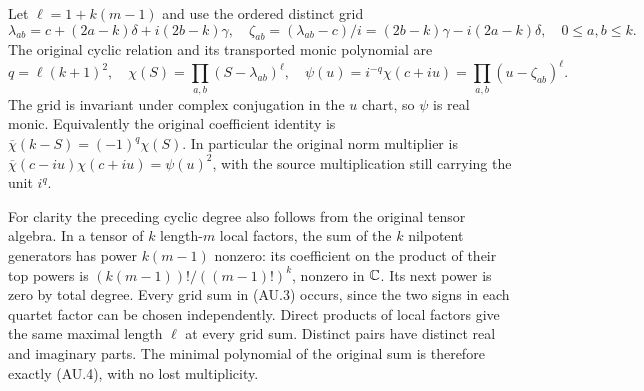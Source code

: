 Let $\ell=1+k(m-1)$ and use the ordered distinct grid
\[
 \lambda_{ab}=c+(2a-k)\delta+i(2b-k)\gamma,
 \quad \zeta_{ab}=(\lambda_{ab}-c)/i
     =(2b-k)\gamma-i(2a-k)\delta,
 \quad 0\le a,b\le k.                                      \tag{AU.3}
\]
The original cyclic relation and its transported monic polynomial are
\[
 q=\ell(k+1)^2,\quad
 \chi(S)=\prod_{a,b}(S-\lambda_{ab})^\ell,\quad
 \psi(u)=i^{-q}\chi(c+iu)=\prod_{a,b}(u-\zeta_{ab})^\ell.
 \tag{AU.4}
\]
The grid is invariant under complex conjugation in the $u$ chart, so
$\psi$ is real monic. Equivalently the original coefficient identity is
$\overline\chi(k-S)=(-1)^q\chi(S)$. In particular the original norm
multiplier is $\overline\chi(c-iu)\chi(c+iu)=\psi(u)^2$, with the
source multiplication still carrying the unit $i^q$.

For clarity the preceding cyclic degree also follows from the original
tensor algebra. In a tensor of $k$ length-$m$ local factors, the sum of
the $k$ nilpotent generators has power $k(m-1)$ nonzero: its coefficient
on the product of their top powers is $(k(m-1))!/((m-1)!)^k$, nonzero
in $\mathbb C$. Its next power is zero by total degree. Every grid sum in
(AU.3) occurs, since the two signs in each quartet factor can be chosen
independently. Direct products of local factors give the same maximal
length $\ell$ at every grid sum. Distinct pairs have distinct real and
imaginary parts. The minimal polynomial of the original sum is
therefore exactly (AU.4), with no lost multiplicity.

